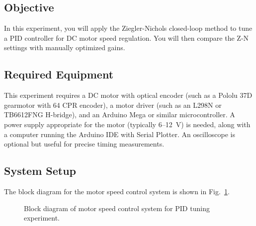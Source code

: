 \subsection{Objective}

In this experiment, you will apply the Ziegler-Nichols closed-loop method to tune a PID controller for DC motor speed regulation. You will then compare the Z-N settings with manually optimized gains.

\subsection{Required Equipment}

This experiment requires a DC motor with optical encoder (such as a Pololu 37D gearmotor with 64 CPR encoder), a motor driver (such as an L298N or TB6612FNG H-bridge), and an Arduino Mega or similar microcontroller. A power supply appropriate for the motor (typically 6--12~V) is needed, along with a computer running the Arduino IDE with Serial Plotter. An oscilloscope is optional but useful for precise timing measurements.

\subsection{System Setup}

The block diagram for the motor speed control system is shown in Fig.~\ref{fig:motor_control_block}.

\begin{figure}[htbp]
\centering
{}
\caption{Block diagram of motor speed control system for PID tuning experiment.}
\label{fig:motor_control_block}
\end{figure}

